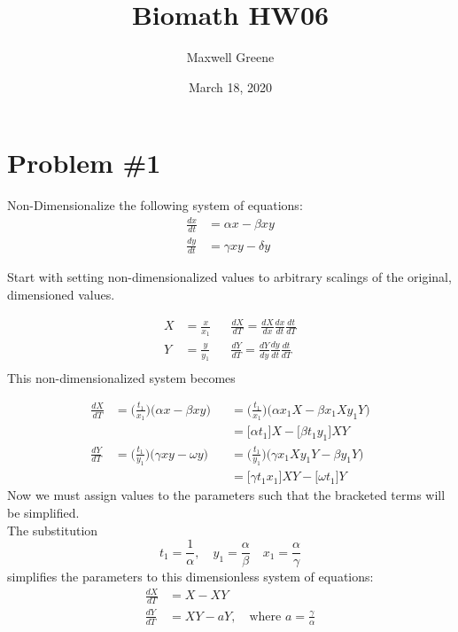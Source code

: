 \documentclass[]{article}
\title{Biomath HW06}
\author{Maxwell Greene}
\date{March 18, 2020}
\begin{document}
\maketitle

\section{Problem \#1}\label{problem-1}

Non-Dimensionalize the following system of equations: \[
\begin{aligned}
\frac{dx}{dt} &= \alpha x - \beta xy \\
\frac{dy}{dt} &= \gamma xy - \delta y
\end{aligned}
\]

Start with setting non-dimensionalized values to arbitrary scalings of
the original, dimensioned values.

\[
\begin{aligned}
X & = \frac{x}{x_1} && \frac{dX}{dT} = \frac{dX}{dx}\frac{dx}{dt}\frac{dt}{dT} \\
Y & = \frac{y}{y_1} && \frac{dY}{dT} = \frac{dY}{dy}\frac{dy}{dt}\frac{dt}{dT} \\
\end{aligned}
\] This non-dimensionalized system becomes

\[
\begin{aligned}
\frac{dX}{dT} &= \Big( \frac{t_1}{x_1}\Big) \Big( \alpha x - \beta xy \Big) &&= \Big( \frac{t_1}{x_1}\Big) \Big( \alpha x_1X - \beta x_1Xy_1Y \Big) \\ 
& &&= \Big[ \alpha t_1 \Big] X - \Big[ \beta t_1 y_1 \Big] XY \\
\frac{dY}{dT} &= \Big( \frac{t_1}{y_1}\Big) \Big( \gamma xy - \omega y \Big) &&= \Big( \frac{t_1}{y_1}\Big) \Big( \gamma x_1X y_1Y - \beta y_1Y \Big) \\ 
& &&= \Big[ \gamma t_1 x_1 \Big] XY - \Big[ \omega t_1 \Big] Y
\end{aligned}
\] Now we must assign values to the parameters such that the bracketed
terms will be simplified.\\
The substitution \[
t_1 = \frac{1}{\alpha}, \quad
y_1 = \frac{\alpha}{\beta} \quad
x_1 = \frac{\alpha}{\gamma}
\] simplifies the parameters to this dimensionless system of equations:
\[
\begin{aligned}
\frac{dX}{dT} &= X-XY \\
\frac{dY}{dT} &= XY-aY, \quad \text{where } a=\frac{\gamma}{\alpha}
\end{aligned}
\]
\end{document}
